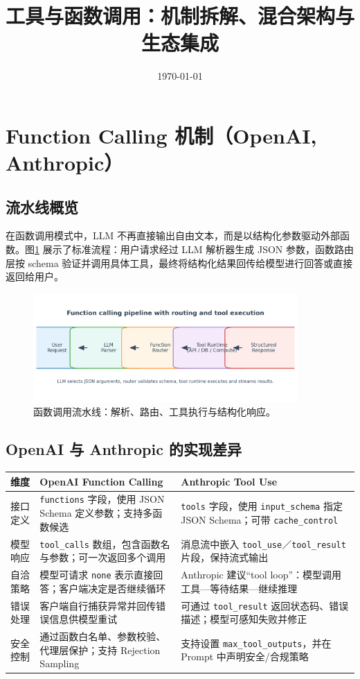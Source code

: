 \documentclass[UTF8,zihao=-4]{ctexart}
\title{工具与函数调用：机制拆解、混合架构与生态集成}
\author{}
\date{\today}
\begin{document}
\maketitle

\section{Function Calling 机制（OpenAI, Anthropic）}
\subsection{流水线概览}
在函数调用模式中，LLM 不再直接输出自由文本，而是以结构化参数驱动外部函数。图\ref{fig:function_pipeline_cn} 展示了标准流程：用户请求经过 LLM 解析器生成 JSON 参数，函数路由层按 schema 验证并调用具体工具，最终将结构化结果回传给模型进行回答或直接返回给用户。
\begin{figure}[H]
  \centering
  \includegraphics[width=0.9\textwidth]{function_calling_pipeline.png}
  \caption{函数调用流水线：解析、路由、工具执行与结构化响应。}
  \label{fig:function_pipeline_cn}
\end{figure}

\subsection{OpenAI 与 Anthropic 的实现差异}
\begin{longtable}{p{3.5cm}p{5cm}p{5cm}}
\toprule
维度 & OpenAI Function Calling & Anthropic Tool Use \\
\midrule
接口定义 & \texttt{functions} 字段，使用 JSON Schema 定义参数；支持多函数候选 & \texttt{tools} 字段，使用 \texttt{input\_schema} 指定 JSON Schema；可带 \texttt{cache\_control} \\
模型响应 & \texttt{tool\_calls} 数组，包含函数名与参数；可一次返回多个调用 & 消息流中嵌入 \texttt{tool\_use}／\texttt{tool\_result} 片段，保持流式输出 \\
自洽策略 & 模型可请求 \texttt{none} 表示直接回答；客户端决定是否继续循环 & Anthropic 建议“tool loop”：模型调用工具—等待结果—继续推理 \\
错误处理 & 客户端自行捕获异常并回传错误信息供模型重试 & 可通过 \texttt{tool\_result} 返回状态码、错误描述；模型可感知失败并修正 \\
安全控制 & 通过函数白名单、参数校验、代理层保护；支持 Rejection Sampling & 支持设置 \texttt{max\_tool\_outputs}，并在 Prompt 中声明安全/合规策略 \\
\bottomrule
\end{longtable}
\end{document}
